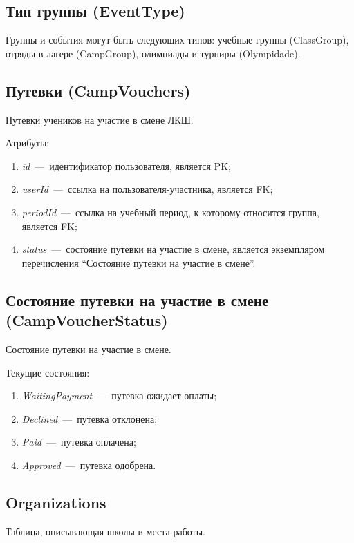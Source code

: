 \documentclass[14pt]{article}
\begin{document}
\subsection{Тип группы (EventType)}

Группы и события могут быть следующих типов: учебные группы (ClassGroup), отряды в лагере (CampGroup), олимпиады и турниры (Olympidade).

\subsection{Путевки (CampVouchers)}

Путевки учеников на участие в смене ЛКШ.

Атрибуты:
\begin{enumerate}
	\item \emph{id}~---~идентификатор пользователя, является PK; 
	\item \emph{userId}~---~ссылка на пользователя-участника, является FK;
	\item \emph{periodId}~---~ссылка на учебный период, к которому относится группа, является FK;
	\item \emph{status}~---~состояние путевки на участие в смене, является экземпляром перечисления ``Состояние путевки на участие в смене''. 
\end{enumerate}

\subsection{Состояние путевки на участие в смене (CampVoucherStatus)}

Состояние путевки на участие в смене.

Текущие состояния:

\begin{enumerate}
	\item \emph{WaitingPayment}~---~путевка ожидает оплаты;
	\item \emph{Declined}~---~путевка отклонена;
	\item \emph{Paid}~---~путевка оплачена;
	\item \emph{Approved}~---~путевка одобрена.
\end{enumerate}

\subsection{Organizations}

Таблица, описывающая школы и места работы.
\end{document}

